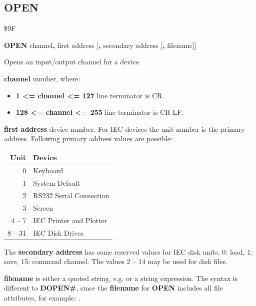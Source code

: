 
\newpage
\subsection{OPEN}
\begin{description}[leftmargin=2cm,style=nextline]
\item [Token:] \$9F
\item [Format:] {\bf OPEN} channel{\bf,} first address
		[{\bf,} secondary address [{\bf,} filename]]
\item [Usage:]
    Opens an input/output channel for a device.

    {\bf channel} number, where:
    \begin{itemize}
        \item {\bf 1 <= channel <= 127} line terminator is CR.
        \item {\bf 128 <= channel <= 255} line terminator is CR LF.
    \end{itemize}

   {\bf first address} device number.
   For IEC devices the unit number is the primary address.
   Following primary address values are possible:

\begin{center}
{\setlength{\tabcolsep}{1mm}
\begin{tabular}{|r|l|}
\hline
{\bf Unit}  & {\bf Device} \\
\hline
0    & Keyboard \\
1    & System Default \\
2    & RS232 Serial Connection \\
3    & Screen \\
4 -- 7  & IEC Printer and Plotter \\
8 -- 31 & IEC Disk Drives \\
\hline
\end{tabular}
}
\end{center}

   The {\bf secondary address} has some reserved values for
   IEC disk units, 0: load, 1: save, 15: command channel.
   The values 2 -- 14 may be used for disk files.

   {\bf filename} is either a quoted string, e.g.  or
   a string expression. The syntax is different to {\bf DOPEN\#},
   since the {\bf filename} for {\bf OPEN} includes all
   file attributes, for example: .


\end{description}
